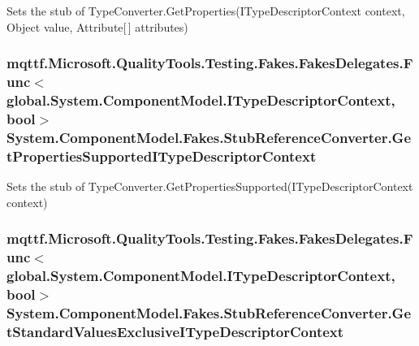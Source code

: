 Sets the stub of Type\-Converter.\-Get\-Properties(\-I\-Type\-Descriptor\-Context context, Object value, Attribute\mbox{[}$\,$\mbox{]} attributes)

\hypertarget{class_system_1_1_component_model_1_1_fakes_1_1_stub_reference_converter_a61eeaa3dc6b7d31efc64fc2a02c9d54a}{
\subsubsection[{Get\-Properties\-Supported\-I\-Type\-Descriptor\-Context}]{\setlength{\rightskip}{0pt plus 5cm}mqttf.\-Microsoft.\-Quality\-Tools.\-Testing.\-Fakes.\-Fakes\-Delegates.\-Func$<$global.\-System.\-Component\-Model.\-I\-Type\-Descriptor\-Context, bool$>$ System.\-Component\-Model.\-Fakes.\-Stub\-Reference\-Converter.\-Get\-Properties\-Supported\-I\-Type\-Descriptor\-Context}}\label{class_system_1_1_component_model_1_1_fakes_1_1_stub_reference_converter_a61eeaa3dc6b7d31efc64fc2a02c9d54a}


Sets the stub of Type\-Converter.\-Get\-Properties\-Supported(\-I\-Type\-Descriptor\-Context context)

\hypertarget{class_system_1_1_component_model_1_1_fakes_1_1_stub_reference_converter_ac9af3858fa4bf805ad1f487f2f10ed05}{
\subsubsection[{Get\-Standard\-Values\-Exclusive\-I\-Type\-Descriptor\-Context}]{\setlength{\rightskip}{0pt plus 5cm}mqttf.\-Microsoft.\-Quality\-Tools.\-Testing.\-Fakes.\-Fakes\-Delegates.\-Func$<$global.\-System.\-Component\-Model.\-I\-Type\-Descriptor\-Context, bool$>$ System.\-Component\-Model.\-Fakes.\-Stub\-Reference\-Converter.\-Get\-Standard\-Values\-Exclusive\-I\-Type\-Descriptor\-Context}}\label{class_system_1_1_component_model_1_1_fakes_1_1_stub_reference_converter_ac9af3858fa4bf805ad1f487f2f10ed05}


